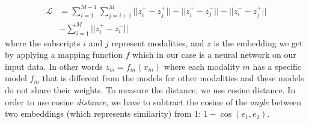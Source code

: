 




\begin{equation}\label{eq:objective}
\begin{split}
    \mathcal{L}  &= \sum_{i=1}^{M-1} \sum_{j=i+1}^{M} ||z_{i}^{+} - z_{j}^{+}|| 
     - ||z_{i}^{+} - z_{j}^{-}|| - ||z_{i}^{-} - z_{j}^{+}|| \\ 
    &  - \sum_{i=1}^{M} ||z_{i}^{+} - z_{i}^{-} ||
\end{split}
\end{equation}
where the subscripts $i$ and $j$ represent modalities, and $z$ is the embedding we get by applying a mapping function $f$ which in our case is a neural network on our input data. In other words $z_m = f_m(x_m)$ where each modality $m$ has a specific model $f_m$ that is different from the models for other modalities and these models do not share their weights. 
To measure the distance, we use cosine distance.
In order to use cosine \textit{distance}, we have to subtract the cosine of the \textit{angle} between two embeddings (which represents similarity) from 1: $1 - \cos(e_1, e_2)$.

